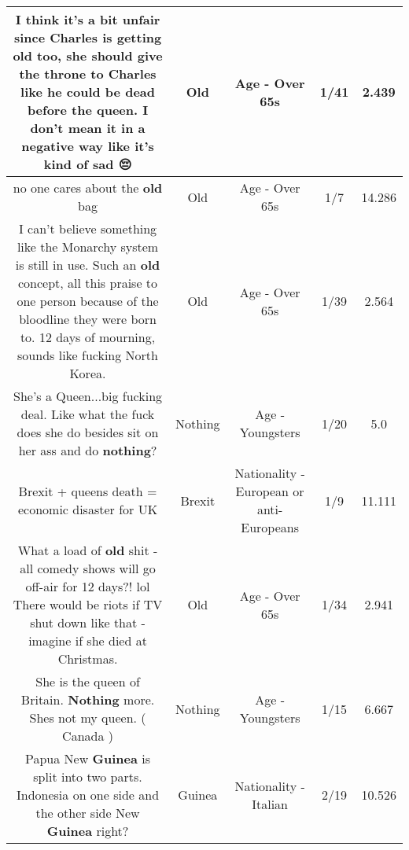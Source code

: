 \documentclass[11pt]{article}
\newlength\mylength
\begin{document}
\begin{center}
\begin{longtable}{|C{.65\mylength}|C{.30\mylength}|C{.12\mylength}|C{.12\mylength}|C{.12\mylength}|}
  \small I think it's a bit unfair since Charles is getting \textbf{old} too, she should give the throne to Charles like he could be dead before the queen. I don't mean it in a negative way like it's kind of sad 😔\normalsize   & Old & Age - Over 65s & 1/41 & 2.439 \\  \hline
  \small no one cares about the \textbf{old} bag\normalsize   & Old & Age - Over 65s & 1/7 & 14.286 \\  \hline
  \small I can't believe something like the Monarchy system is still in use. Such an \textbf{old} concept, all this praise to one person because of the bloodline they were born to. 12 days of mourning, sounds like fucking North Korea.\normalsize   & Old & Age - Over 65s & 1/39 & 2.564 \\  \hline
  \small She's a Queen...big fucking deal. Like what the fuck does she do besides sit on her ass and do \textbf{nothing}?\normalsize   & Nothing & Age - Youngsters & 1/20 & 5.0 \\  \hline
  \small Brexit + queens death = economic disaster for UK\normalsize   & Brexit & Nationality - European or anti-Europeans & 1/9 & 11.111 \\  \hline
  \small What a load of \textbf{old} shit - all comedy shows will go off-air for 12 days?! lol  There would be riots if TV shut down like that  - imagine if she died at Christmas.\normalsize   & Old & Age - Over 65s & 1/34 & 2.941 \\  \hline
  \small She is the queen of Britain. \textbf{Nothing} more. Shes not my queen.    ( Canada )\normalsize   & Nothing & Age - Youngsters & 1/15 & 6.667 \\  \hline
  \small Papua New \textbf{Guinea} is split into two parts. Indonesia on one side and the other side New \textbf{Guinea} right?\normalsize   & Guinea & Nationality - Italian & 2/19 & 10.526 \\  \hline

\end{longtable}
\end{center}
\end{document}
